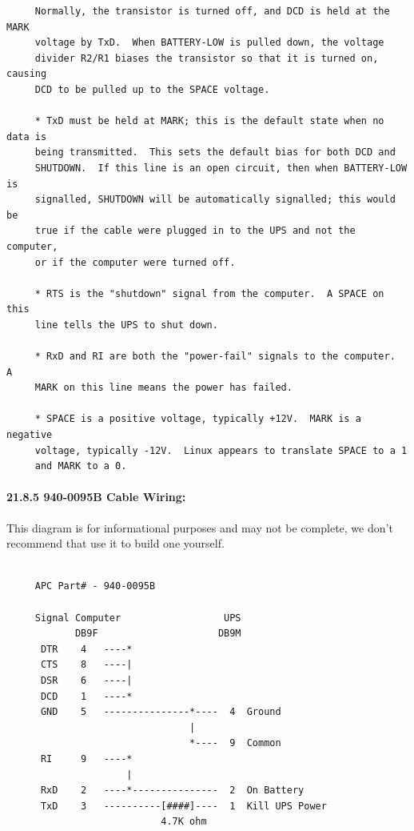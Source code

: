 {{{{{{{{{{\begin{verbatim}
     Normally, the transistor is turned off, and DCD is held at the MARK
     voltage by TxD.  When BATTERY-LOW is pulled down, the voltage
     divider R2/R1 biases the transistor so that it is turned on, causing
     DCD to be pulled up to the SPACE voltage.
     
     * TxD must be held at MARK; this is the default state when no data is
     being transmitted.  This sets the default bias for both DCD and
     SHUTDOWN.  If this line is an open circuit, then when BATTERY-LOW is
     signalled, SHUTDOWN will be automatically signalled; this would be
     true if the cable were plugged in to the UPS and not the computer,
     or if the computer were turned off.
     
     * RTS is the "shutdown" signal from the computer.  A SPACE on this
     line tells the UPS to shut down.
     
     * RxD and RI are both the "power-fail" signals to the computer.  A
     MARK on this line means the power has failed.
     
     * SPACE is a positive voltage, typically +12V.  MARK is a negative
     voltage, typically -12V.  Linux appears to translate SPACE to a 1
     and MARK to a 0.
\end{verbatim}
\normalsize

\label{940_002d0095B-Cable-Wiring}

\paragraph*{21.8.5 940-0095B Cable Wiring:}

\label{index-Cables-207}
This diagram is for informational purposes and may not be complete, we don't
recommend that use it to build one yourself. 

\footnotesize
\begin{verbatim}
     
     APC Part# - 940-0095B
     
     Signal Computer                  UPS
            DB9F                     DB9M
      DTR    4   ----*
      CTS    8   ----|
      DSR    6   ----|
      DCD    1   ----*
      GND    5   ---------------*----  4  Ground
                                |
                                *----  9  Common
      RI     9   ----*
                     |
      RxD    2   ----*---------------  2  On Battery
      TxD    3   ----------[####]----  1  Kill UPS Power
                           4.7K ohm
\end{verbatim}
\normalsize

}}}}}}}}}}
